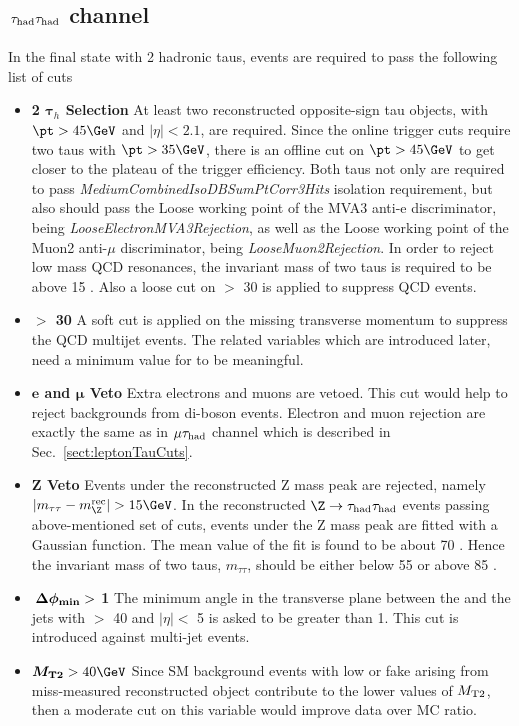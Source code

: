 \subsection{\texorpdfstring{$\,\tau_{\rm had}\tau_{\rm had}$ channel}{tau-tau channel}}
\label{sect:tauTauCuts}
In the final state with 2 hadronic taus, events are required to pass the following list of cuts
\begin{itemize}
\item \textbf{2 $\boldsymbol\tau_h$ Selection} At least two reconstructed opposite-sign tau objects, 
with $\pt>45\GeV$ and $|\eta|<2.1$, are required. Since the online trigger cuts require two taus with 
$\pt>35\GeV$, there is an offline cut on $\pt>45\GeV$ to get closer to the plateau of the trigger efficiency. 
Both taus not only are required to pass \emph{MediumCombinedIsoDBSumPtCorr3Hits} isolation requirement, 
but also should pass the Loose working point of the MVA3 anti-e discriminator, being \emph{LooseElectronMVA3Rejection}, 
as well as the Loose working point of the Muon2 anti-$\mu$ discriminator, being \emph{LooseMuon2Rejection}. 
In order to reject low mass QCD resonances, the invariant mass of two taus is required to be above 15 \GeV. Also a loose cut on \MET $>$ 30 \GeV is applied to suppress QCD events.
\item \textbf{\MET $>$ 30 \GeV} A soft cut is applied on the missing transverse momentum to suppress the QCD multijet events. 
The \MET related variables which are introduced later, need a minimum value for \MET to be meaningful. 
\item \textbf{$\boldsymbol e$ and $\boldsymbol\mu$ Veto} Extra electrons and muons are vetoed. This 
cut would help to reject backgrounds from di-boson events. Electron and muon rejection 
are exactly the same as in $\mu\tau_{\rm had}$ channel which is described in Sec.~\ref{sect:leptonTauCuts}.
\item \textbf{Z Veto} Events under the reconstructed Z mass peak are rejected, namely $|m_{\tau\tau}-m_{\Z}^{\rm rec}|>15\GeV$. 
In the reconstructed $\Z\rightarrow \Tau\Tau$ events passing above-mentioned set of cuts, events under the Z mass peak are fitted 
with a Gaussian function. The mean value of the fit is found to be about 70 \GeV. Hence the invariant mass of two taus, $m_{\tau\tau}$, should be 
either below 55 \GeV or above 85 \GeV.  
\item \textbf{$\boldsymbol{\,{\Delta\phi_{\rm min}}} > $ 1} The minimum angle in the transverse plane between the \MET and the jets with \PT $>$ 40 \GeV and $|\eta| <$ 5 is asked to be greater than 1. This cut is introduced against multi-jet events.
\item \textbf{$\boldsymbol\mttwo>40\GeV$} Since SM background events with low \MET or fake \MET arising from miss-measured reconstructed object
 contribute to the lower values of ${M_{\rm T2}}$, then a moderate cut on this variable would improve data over MC ratio.  
\end{itemize}
